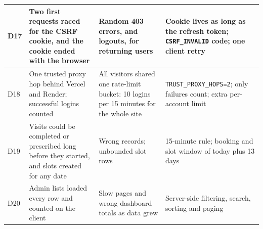 \begin{longtable}{|C{0.8cm}|L{4.3cm}|L{3.9cm}|L{4.2cm}|}
\hline
D17 & Two first requests raced for the CSRF cookie, and the cookie ended with the browser & Random 403 errors, and logouts, for returning users & Cookie lives as long as the refresh token; \texttt{CSRF\_INVALID} code; one client retry \\
\hline
D18 & One trusted proxy hop behind Vercel and Render; successful logins counted & All visitors shared one rate-limit bucket: 10 logins per 15 minutes for the whole site & \texttt{TRUST\_PROXY\_HOPS=2}; only failures count; extra per-account limit \\
\hline
D19 & Visits could be completed or prescribed long before they started, and slots created for any date & Wrong records; unbounded slot rows & 15-minute rule; booking and slot window of today plus 13 days \\
\hline
D20 & Admin lists loaded every row and counted on the client & Slow pages and wrong dashboard totals as data grew & Server-side filtering, search, sorting and paging \\
\hline
\end{longtable}

